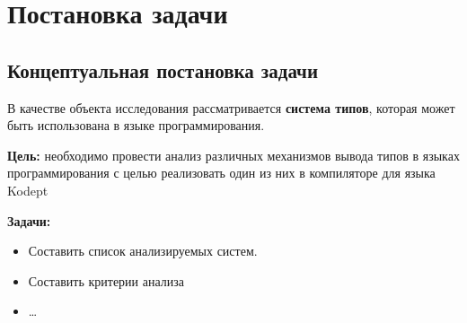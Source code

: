 \chapter{Постановка задачи}
\section{Концептуальная постановка задачи}

В качестве объекта исследования рассматривается \textbf{система типов}, которая может быть использована в языке программирования.

\textbf{Цель:} необходимо провести анализ различных механизмов вывода типов в языках программирования с целью реализовать один из них в компиляторе для языка Kodept

\textbf{Задачи:}
\begin{itemize}
    \item Составить список анализируемых систем.
    \item Составить критерии анализа
    \item \ldots
\end{itemize}



